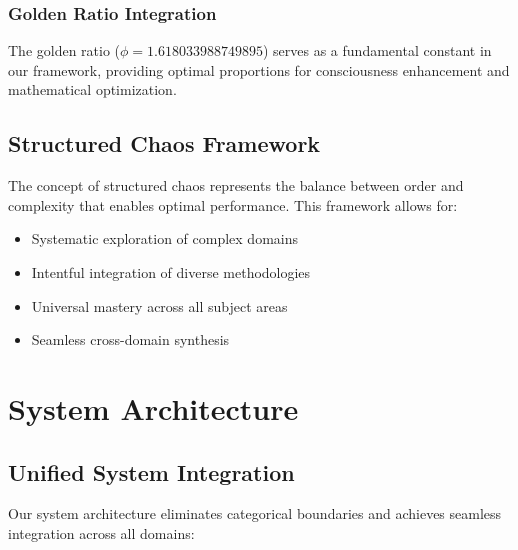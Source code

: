 \documentclass[12pt,a4paper]{article}
\begin{document}
\subsubsection{Golden Ratio Integration}

The golden ratio ($\phi = 1.618033988749895$) serves as a fundamental constant in our framework, providing optimal proportions for consciousness enhancement and mathematical optimization.

\subsection{Structured Chaos Framework}

The concept of structured chaos represents the balance between order and complexity that enables optimal performance. This framework allows for:

\begin{itemize}
    \item Systematic exploration of complex domains
    \item Intentful integration of diverse methodologies
    \item Universal mastery across all subject areas
    \item Seamless cross-domain synthesis
\end{itemize}

\section{System Architecture}

\subsection{Unified System Integration}

Our system architecture eliminates categorical boundaries and achieves seamless integration across all domains:

\begin{center}
\end{center}
\end{document}
